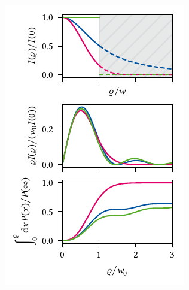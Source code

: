 \begin{marginfigure}
    \centering
    \includegraphics{img/pdf/setup/modes_1d}
    \caption[]{}
    \label{fig:setup:optics:coupling:modes_1d}
\end{marginfigure}

